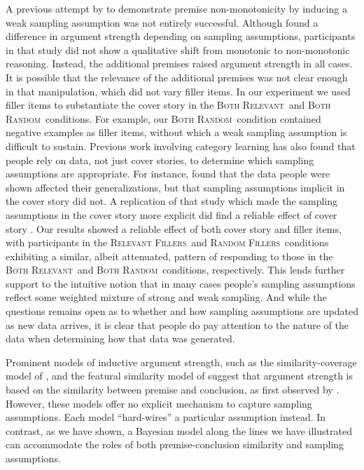 \documentclass[doc,12pt]{apa}
\newcommand{\relevant}{\textsc{Both Relevant}}
\newcommand{\relevantdata}{\textsc{Relevant Fillers}}
\newcommand{\randomdata}{\textsc{Random Fillers}}
\newcommand{\random}{\textsc{Both Random}}
\begin{document}
%
A previous attempt by  to demonstrate premise non-monotonicity by inducing a weak sampling assumption was not entirely successful. Although  found a difference in argument strength depending on sampling assumptions, participants in that study did not show a qualitative shift from monotonic to non-monotonic reasoning. Instead, the additional premises raised argument strength in all cases.  It is possible that the relevance of the additional premises was not clear enough in that manipulation, which did not vary filler items. In our experiment we used filler items to substantiate the cover story in the \relevant\ and \random\ conditions. For example, our \random\ condition contained negative examples as filler items, without which a weak sampling assumption is difficult to sustain.  Previous work involving category learning has also found that people rely on data, not just cover stories, to determine which sampling assumptions are appropriate. For instance,  found that the data people were shown affected their generalizations, but that sampling assumptions implicit in the cover story did not. A replication of that study which made the sampling assumptions in the cover story more explicit did find a reliable effect of cover story \cite{VHPN13}. Our results showed a reliable effect of both cover story and filler items, with participants in the \relevantdata\ and \randomdata\ conditions exhibiting a similar, albeit attenuated, pattern of responding to those in the \relevant\ and \random\ conditions, respectively. This lends further support to the intuitive notion that in many cases people's sampling assumptions reflect some weighted mixture of strong and weak sampling. And while the questions remains open as to whether and how sampling assumptions are updated as new data arrives, it is clear that people do pay attention to the nature of the data when determining how that data was generated.


%
Prominent models of inductive argument strength, such as the similarity-coverage model of , and the featural similarity model of  suggest that argument strength is based on the similarity between premise and conclusion, as first observed by . However, these models offer no explicit mechanism to capture sampling assumptions. Each model ``hard-wires'' a particular assumption instead. In contrast, as we have shown, a Bayesian model along the lines we have illustrated can accommodate the roles of both premise-conclusion similarity and sampling assumptions.
\end{document}
